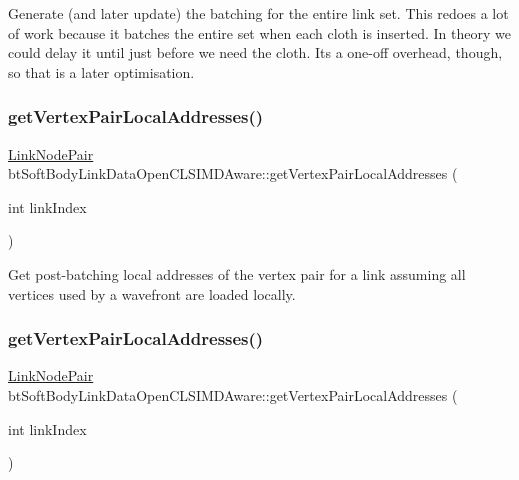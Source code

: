 Generate (and later update) the batching for the entire link set. This redoes a lot of work because it batches the entire set when each cloth is inserted. In theory we could delay it until just before we need the cloth. It\textquotesingle{}s a one-\/off overhead, though, so that is a later optimisation. \mbox{\label{classbtSoftBodyLinkDataOpenCLSIMDAware_a02bb3654ae8ced9acdae914a23e0ae2b}} 
\subsubsection{\texorpdfstring{get\+Vertex\+Pair\+Local\+Addresses()}{getVertexPairLocalAddresses()}\hspace{0.1cm}{\footnotesize\ttfamily [1/2]}}
{\footnotesize\ttfamily \hyperlink{classbtSoftBodyLinkData_1_1LinkNodePair}{Link\+Node\+Pair} bt\+Soft\+Body\+Link\+Data\+Open\+C\+L\+S\+I\+M\+D\+Aware\+::get\+Vertex\+Pair\+Local\+Addresses (\begin{DoxyParamCaption}\item[{int}]{link\+Index }\end{DoxyParamCaption})\hspace{0.3cm}{\ttfamily [inline]}}

Get post-\/batching local addresses of the vertex pair for a link assuming all vertices used by a wavefront are loaded locally. \mbox{\label{classbtSoftBodyLinkDataOpenCLSIMDAware_a02bb3654ae8ced9acdae914a23e0ae2b}} 
\subsubsection{\texorpdfstring{get\+Vertex\+Pair\+Local\+Addresses()}{getVertexPairLocalAddresses()}\hspace{0.1cm}{\footnotesize\ttfamily [2/2]}}
{\footnotesize\ttfamily \hyperlink{classbtSoftBodyLinkData_1_1LinkNodePair}{Link\+Node\+Pair} bt\+Soft\+Body\+Link\+Data\+Open\+C\+L\+S\+I\+M\+D\+Aware\+::get\+Vertex\+Pair\+Local\+Addresses (\begin{DoxyParamCaption}\item[{int}]{link\+Index }\end{DoxyParamCaption})\hspace{0.3cm}{\ttfamily [inline]}}

